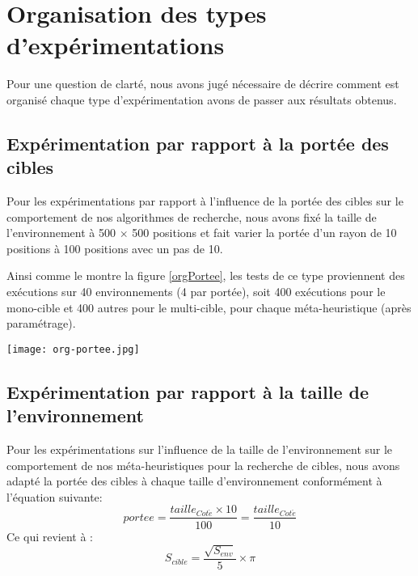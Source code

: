 
\chapter{Organisation des types d'expérimentations} %

\label{AppendixC} %



Pour une question de clarté, nous avons jugé nécessaire de décrire comment est organisé chaque type d'expérimentation avons de passer aux résultats obtenus.

\section{Expérimentation par rapport à la portée des cibles}
Pour les expérimentations par rapport à l'influence de la portée des cibles sur le comportement de nos algorithmes de recherche, nous avons fixé la taille de l'environnement à 500 $\times$ 500 positions et fait varier la portée d'un rayon de 10 positions à 100 positions avec un pas de 10.

Ainsi comme le montre la figure \ref{orgPortee}, les tests de ce type proviennent des exécutions sur 40 environnements (4 par portée), soit 400 exécutions pour le mono-cible et 400 autres pour le multi-cible, pour chaque méta-heuristique (après paramétrage).

\begin{center}	 
	\captionsetup{width=1\linewidth} 
	\texttt{[image: org-portee.jpg]}%
	\vspace{-0.1 cm}
	\label{orgPortee}%
\end{center}

\section{Expérimentation par rapport à la taille de l'environnement}
Pour les expérimentations sur l'influence de la taille de l'environnement sur le comportement de nos méta-heuristiques pour la recherche de cibles, nous avons adapté la portée des cibles à chaque taille d'environnement conformément à l'équation suivante:
\begin{equation}
portee = \frac{taille_{Cot\acute{e}} \times 10}{100} = \frac{taille_{Cot\acute{e}}}{10}
\label{porteeEnv}
\end{equation}	
Ce qui revient à :
\begin{equation}	
S_{cible} = \frac{\sqrt{S_{env}}}{5} \times \pi
\end{equation}

